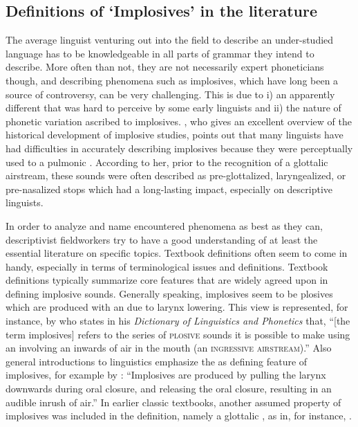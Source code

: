\documentclass[output=paper]{LSP/langsci}
\begin{document}
\subsection{Definitions of `Implosives' in the literature} 
\label{sec:grimm:1.1}

The average linguist venturing out into the field to describe an under-studied language has to be knowledgeable in all parts of grammar they intend to describe. More often than not, they are not necessarily expert phoneticians though, and describing phenomena such as implosives, which have long been a source of controversy, can be very challenging. This is due to i) an apparently different  that was hard to perceive by some early linguists and ii) the nature of phonetic variation ascribed to implosives. \citet{Xi2009}, who gives an excellent overview of the historical development of implosive studies, points out that many linguists have had difficulties in accurately describing implosives because they were perceptually used to a pulmonic . According to her, prior to the recognition of a glottalic airstream, these sounds were often described as pre-glottalized, laryngealized, or pre-nasalized stops which had a long-lasting impact, especially on descriptive linguists.  

In order to analyze and name encountered phenomena as best as they can, descriptivist fieldworkers try to have a good understanding of at least the essential literature on specific topics. 
Textbook definitions often seem to come in handy, especially in terms of terminological issues and definitions. 
Textbook definitions typically summarize core features that are widely agreed upon in defining implosive sounds. Generally speaking, implosives seem to be plosives which are produced with an  due to larynx lowering. This view is represented, for instance, by \citet{Crystal2008} who states in his {\it Dictionary of Linguistics and Phonetics} that,
``[the term implosives] refers to the series of \textsc{plosive} sounds it is possible to make using an  involving an inwards  of air in the mouth (an \textsc{ingressive airstream}).''  Also general introductions to linguistics emphasize the  as defining feature of implosives, for example by \citet[41]{McGregor2015}: ``Implosives are produced by pulling the larynx downwards during oral closure, and releasing the oral closure, resulting in an audible inrush of air.'' In earlier classic textbooks, another assumed property of implosives was included in the definition, namely a glottalic , as in, for instance, \citet{Fromkin1998}.
\end{document}
